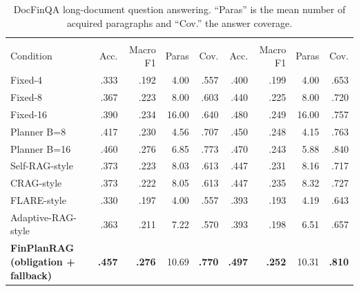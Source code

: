 \begin{table}[t]
\centering
\scriptsize
\setlength{\tabcolsep}{3pt}
\caption{DocFinQA long-document question answering. ``Paras'' is the mean number of acquired paragraphs and ``Cov.'' the answer coverage.}
\label{tab:docfinqa}
\begin{tabular}{lrrrrrrrr}
\toprule
 &  &  \\
\cmidrule(lr){2-5}\cmidrule(lr){6-9}
Condition & Acc. & Macro F1 & Paras & Cov. & Acc. & Macro F1 & Paras & Cov. \\
\midrule
Fixed-4 & .333 & .192 & 4.00 & .557 & .400 & .199 & 4.00 & .653 \\
Fixed-8 & .367 & .223 & 8.00 & .603 & .440 & .225 & 8.00 & .720 \\
Fixed-16 & .390 & .234 & 16.00 & .640 & .480 & .249 & 16.00 & .757 \\
Planner B=8 & .417 & .230 & 4.56 & .707 & .450 & .248 & 4.15 & .763 \\
Planner B=16 & .460 & .276 & 6.85 & .773 & .470 & .243 & 5.88 & .840 \\
Self-RAG-style & .373 & .223 & 8.03 & .613 & .447 & .231 & 8.16 & .717 \\
CRAG-style & .373 & .222 & 8.05 & .613 & .447 & .235 & 8.32 & .727 \\
FLARE-style & .330 & .197 & 4.00 & .557 & .393 & .193 & 4.19 & .643 \\
Adaptive-RAG-style & .363 & .211 & 7.22 & .570 & .393 & .198 & 6.51 & .657 \\
\midrule
\textbf{FinPlanRAG (obligation + fallback)} & \textbf{.457} & \textbf{.276} & 10.69 & \textbf{.770} & \textbf{.497} & \textbf{.252} & 10.31 & \textbf{.810} \\
\bottomrule
\end{tabular}
\end{table}
